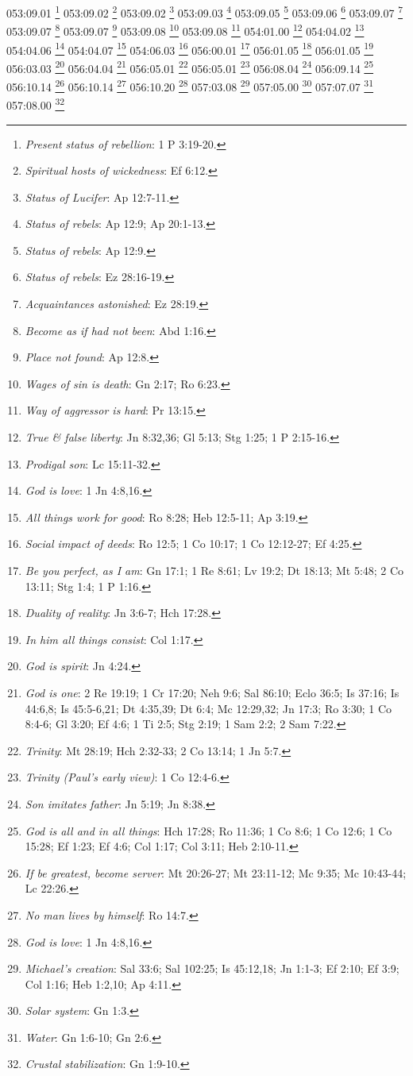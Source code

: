 053:09.01 \footnote{\textit{Present status of rebellion}: 1 P 3:19-20.}
053:09.02 \footnote{\textit{Spiritual hosts of wickedness}: Ef 6:12.}
053:09.02 \footnote{\textit{Status of Lucifer}: Ap 12:7-11.}
053:09.03 \footnote{\textit{Status of rebels}: Ap 12:9; Ap 20:1-13.}
053:09.05 \footnote{\textit{Status of rebels}: Ap 12:9.}
053:09.06 \footnote{\textit{Status of rebels}: Ez 28:16-19.}
053:09.07 \footnote{\textit{Acquaintances astonished}: Ez 28:19.}
053:09.07 \footnote{\textit{Become as if had not been}: Abd 1:16.}
053:09.07 \footnote{\textit{Place not found}: Ap 12:8.}
053:09.08 \footnote{\textit{Wages of sin is death}: Gn 2:17; Ro 6:23.}
053:09.08 \footnote{\textit{Way of aggressor is hard}: Pr 13:15.}
054:01.00 \footnote{\textit{True & false liberty}: Jn 8:32,36; Gl 5:13; Stg 1:25; 1 P 2:15-16.}
054:04.02 \footnote{\textit{Prodigal son}: Lc 15:11-32.}
054:04.06 \footnote{\textit{God is love}: 1 Jn 4:8,16.}
054:04.07 \footnote{\textit{All things work for good}: Ro 8:28; Heb 12:5-11; Ap 3:19.}
054:06.03 \footnote{\textit{Social impact of deeds}: Ro 12:5; 1 Co 10:17; 1 Co 12:12-27; Ef 4:25.}
056:00.01 \footnote{\textit{Be you perfect, as I am}: Gn 17:1; 1 Re 8:61; Lv 19:2; Dt 18:13; Mt 5:48; 2 Co 13:11; Stg 1:4; 1 P 1:16.}
056:01.05 \footnote{\textit{Duality of reality}: Jn 3:6-7; Hch 17:28.}
056:01.05 \footnote{\textit{In him all things consist}: Col 1:17.}
056:03.03 \footnote{\textit{God is spirit}: Jn 4:24.}
056:04.04 \footnote{\textit{God is one}: 2 Re 19:19; 1 Cr 17:20; Neh 9:6; Sal 86:10; Eclo 36:5; Is 37:16; Is 44:6,8; Is 45:5-6,21; Dt 4:35,39; Dt 6:4; Mc 12:29,32; Jn 17:3; Ro 3:30; 1 Co 8:4-6; Gl 3:20; Ef 4:6; 1 Ti 2:5; Stg 2:19; 1 Sam 2:2; 2 Sam 7:22.}
056:05.01 \footnote{\textit{Trinity}: Mt 28:19; Hch 2:32-33; 2 Co 13:14; 1 Jn 5:7.}
056:05.01 \footnote{\textit{Trinity (Paul's early view)}: 1 Co 12:4-6.}
056:08.04 \footnote{\textit{Son imitates father}: Jn 5:19; Jn 8:38.}
056:09.14 \footnote{\textit{God is all and in all things}: Hch 17:28; Ro 11:36; 1 Co 8:6; 1 Co 12:6; 1 Co 15:28; Ef 1:23; Ef 4:6; Col 1:17; Col 3:11; Heb 2:10-11.}
056:10.14 \footnote{\textit{If be greatest, become server}: Mt 20:26-27; Mt 23:11-12; Mc 9:35; Mc 10:43-44; Lc 22:26.}
056:10.14 \footnote{\textit{No man lives by himself}: Ro 14:7.}
056:10.20 \footnote{\textit{God is love}: 1 Jn 4:8,16.}
057:03.08 \footnote{\textit{Michael's creation}: Sal 33:6; Sal 102:25; Is 45:12,18; Jn 1:1-3; Ef 2:10; Ef 3:9; Col 1:16; Heb 1:2,10; Ap 4:11.}
057:05.00 \footnote{\textit{Solar system}: Gn 1:3.}
057:07.07 \footnote{\textit{Water}: Gn 1:6-10; Gn 2:6.}
057:08.00 \footnote{\textit{Crustal stabilization}: Gn 1:9-10.}
